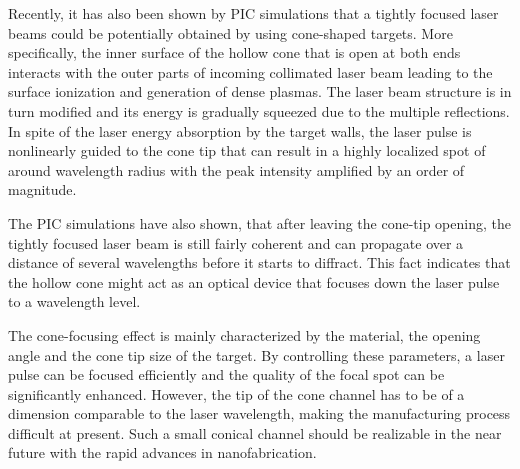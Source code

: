 Recently, it has also been shown by PIC simulations that a tightly focused laser beams could be potentially obtained by using cone-shaped targets. More specifically, the inner surface of the hollow cone that is open at both ends interacts with the outer parts of incoming collimated laser beam leading to the surface ionization and generation of dense plasmas. The laser beam structure is in turn modified and its energy is gradually squeezed due to the multiple reflections. In spite of the laser energy absorption by the target walls, the laser pulse is nonlinearly guided to the cone tip that can result in a highly localized spot of around wavelength radius with the peak intensity amplified by an order of magnitude.

The PIC simulations have also shown, that after leaving the cone-tip opening, the tightly focused laser beam is still fairly coherent and can propagate over a distance of several wavelengths before it starts to diffract. This fact indicates that the hollow cone might act as an optical device that focuses down the laser pulse to a wavelength level.

The cone-focusing effect is mainly characterized by the material, the opening angle and the cone tip size of the target. By controlling these parameters, a laser pulse can be focused efficiently and the quality of the focal spot can be significantly enhanced. However, the tip of the cone channel has to be of a dimension comparable to the laser wavelength, making the manufacturing process difficult at present. Such a small conical channel should be realizable in the near future with the rapid advances in nanofabrication.